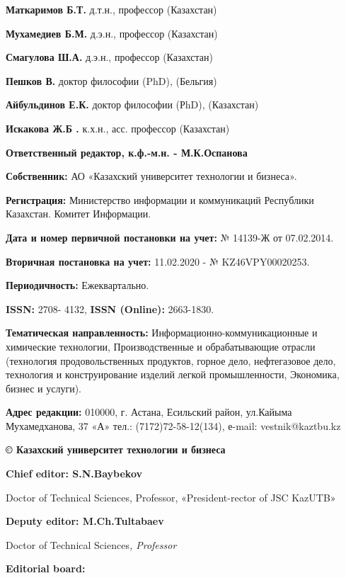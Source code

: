 \textbf{Маткаримов Б.Т.} д.т.н., профессор (Казахстан)

\textbf{Мухамедиев Б.М.} д.э.н., профессор (Казахстан)

\textbf{Смагулова Ш.А.} д.э.н., профессор (Казахстан)

\textbf{Пешков В.} доктор философии (PhD), (Бельгия)

\textbf{Айбульдинов Е.К.} доктор философии (РhD), (Казахстан)

\textbf{Искакова Ж.Б .} к.х.н., асс. профессор (Казахстан)

\begin{center}
\textbf{Ответственный редактор, к.ф.-м.н. - М.К.Оспанова}
\end{center}

\textbf{Собственник:} АО «Казахский университет технологии и бизнеса».

\textbf{Регистрация:} Министерство информации и коммуникаций Республики
Казахстан. Комитет Информации.

\textbf{Дата и номер первичной постановки на учет:} № 14139-Ж от
07.02.2014.

\textbf{Вторичная постановка на учет:} 11.02.2020 - № KZ46VPY00020253.

\textbf{Периодичность:} Ежеквартально.

\textbf{ISSN:} 2708- 4132, \textbf{ISSN (Online):} 2663-1830.

\textbf{Тематическая направленность:} Информационно-коммуникационные и
химические технологии, Производственные и обрабатывающие отрасли (технология
продовольственных продуктов, горное дело, нефтегазовое дело, технология и
конструирование изделий легкой промышленности, Экономика, бизнес и
услуги).

\textbf{Адрес редакции:} 010000, г. Астана, Есильский район, ул.Кайыма
Мухамедханова, 37 «А» тел.: (7172)72-58-12(134), е-mail: vestnik@kaztbu.kz

\begin{center}
\textbf{\large © Казахский университет технологии и бизнеса}
\end{center}

\pagebreak

\begin{center}
\textbf{Chief editor: S.N.Baybekov}

Doctor of Technical Sciences, Professor, «President-rector of JSC
KazUTB»

\textbf{Deputy editor: M.Ch.Tultabaev}

Doctor of Technical Sciences\emph{, Professor}

\textbf{Editorial board:}
\end{center}

